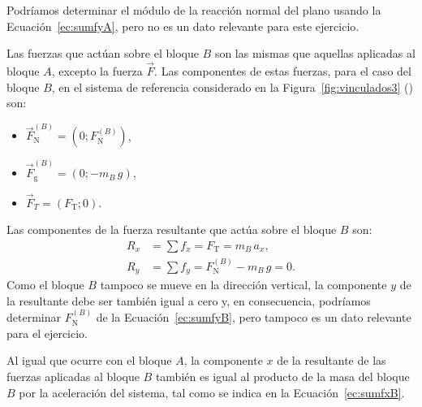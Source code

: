 \documentclass[addpoints]{exam}
\begin{document}
\begin{questions}
\begin{solution}
        Podríamos determinar el módulo de la reacción normal del plano usando la Ecuación~\eqref{ec:sumfyA}, pero no es un dato relevante para este ejercicio.
        
        Las fuerzas que actúan sobre el bloque $B$ son las mismas que aquellas aplicadas al bloque $A$, excepto la fuerza $\vec{F}$. Las componentes de estas fuerzas, para el caso del bloque $B$, en el sistema de referencia considerado en la Figura~\ref{fig:vinculados3} () son:
        \begin{itemize}
            \item $\vec{F}_\text{N}^{(B)} = \left(0; F_\text{N}^{(B)}\right)$,
            \item $\vec{F}_\text{g}^{(B)} = \left(0; - m_B \, g\right)$,
            \item $\vec{F}_T = \left(F_\text{T};0\right)$.
        \end{itemize} Las componentes de la fuerza resultante que actúa sobre el bloque $B$ son:
        \begin{align}
            R_x &= \sum f_x = F_\text{T} = m_B \, a_x, \label{ec:sumfxB} \\
            R_y &= \sum f_y = F_\text{N}^{(B)} - m_B \, g = 0. \label{ec:sumfyB}
        \end{align} Como el bloque $B$ tampoco se mueve en la dirección vertical, la componente $y$ de la resultante debe ser también igual a cero y, en consecuencia, podríamos determinar $F_\text{N}^{(B)}$ de la Ecuación~\eqref{ec:sumfyB}, pero tampoco es un dato relevante para el ejercicio.

        Al igual que ocurre con el bloque $A$, la componente $x$ de la resultante de las fuerzas aplicadas al bloque $B$ también es igual al producto de la masa del bloque $B$ por la aceleración del sistema, tal como se indica en la Ecuación~\eqref{ec:sumfxB}.


\end{solution}
\end{questions}
\end{document}
